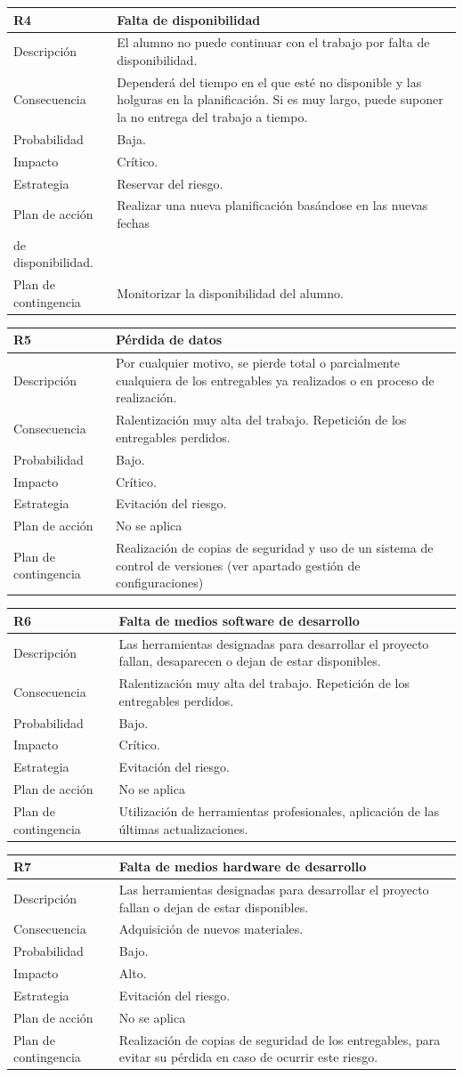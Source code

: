 \documentclass[twoside]{report}
\newcommand\addrow[2]{#1 &#2\\ }
\newcommand\addheading[2]{#1 &#2\\ \hline}
\newcommand\tabularhead{\begin{tabular}{lp{0.7\textwidth}}
\hline
}
\newenvironment{risk}{\tabularhead}
{\hline\end{tabular}}
\begin{document}
\begin{risk}
  \addheading{R4}{Falta de disponibilidad}
  \addrow{Descripción}{El alumno no puede continuar con el trabajo por falta de disponibilidad.}
  \addrow{Consecuencia}{Dependerá del tiempo en el que esté no disponible y las holguras en la planificación. Si es muy largo, puede suponer la no entrega del trabajo a tiempo.}
  \addrow{Probabilidad}{Baja.}
  \addrow{Impacto}{Crítico. }
  \addrow{Estrategia}{Reservar del riesgo.}
  \addrow{Plan de acción}{Realizar una nueva planificación basándose en las nuevas fechas \\de disponibilidad.}
  \addrow{Plan de contingencia}{Monitorizar la disponibilidad del alumno.}
\end{risk}

\begin{risk}
  \addheading{R5}{Pérdida de datos}
  \addrow{Descripción}{Por cualquier motivo, se pierde total o parcialmente cualquiera de los entregables ya realizados o en proceso de realización.}
  \addrow{Consecuencia}{Ralentización muy alta del trabajo. Repetición de los entregables perdidos. }
  \addrow{Probabilidad}{Bajo.}
  \addrow{Impacto}{Crítico. }
  \addrow{Estrategia}{Evitación del riesgo.}
  \addrow{Plan de acción}{No se aplica}
  \addrow{Plan de contingencia}{Realización de copias de seguridad y uso de un sistema de control de versiones (ver apartado gestión de configuraciones)}
\end{risk}

\begin{risk}
  \addheading{R6}{Falta de medios software de desarrollo}
  \addrow{Descripción}{Las herramientas designadas para desarrollar el proyecto fallan, desaparecen o dejan de estar disponibles.}
  \addrow{Consecuencia}{Ralentización muy alta del trabajo. Repetición de los entregables perdidos. }
  \addrow{Probabilidad}{Bajo.}
  \addrow{Impacto}{Crítico. }
  \addrow{Estrategia}{Evitación del riesgo.}
  \addrow{Plan de acción}{No se aplica}
  \addrow{Plan de contingencia}{Utilización de herramientas profesionales, aplicación de las últimas actualizaciones.}
\end{risk}

\begin{risk}
  \addheading{R7}{Falta de medios hardware de desarrollo}
  \addrow{Descripción}{Las herramientas designadas para desarrollar el proyecto fallan o dejan de estar disponibles.}
  \addrow{Consecuencia}{Adquisición de nuevos materiales.}
  \addrow{Probabilidad}{Bajo.}
  \addrow{Impacto}{Alto. }
  \addrow{Estrategia}{Evitación del riesgo.}
  \addrow{Plan de acción}{No se aplica}
  \addrow{Plan de contingencia}{Realización de copias de seguridad de los entregables, para evitar su pérdida en caso de ocurrir este riesgo.}
\end{risk}
\end{document}
